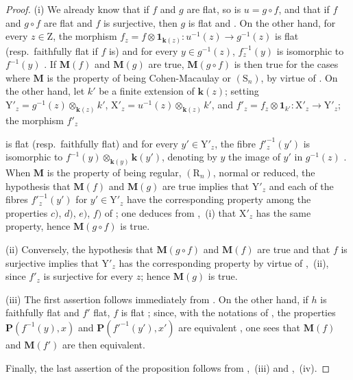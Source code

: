 \begin{proof}
(i) We already know that if $f$ and $g$ are flat, so is $u=g\circ f$, and that if $f$ and $g\circ f$ are flat and $f$ is surjective, then $g$ is flat  and . On the other hand, for every $z\in\mathrm{Z}$, the morphism $f_z=f\otimes\mathbf{1}_{\boldsymbol{k}(z)}:u^{-1}(z)\to g^{-1}(z)$ is flat (resp.\ faithfully flat if $f$ is) and for every $y\in g^{-1}(z)$, $f_z^{-1}(y)$ is isomorphic to $f^{-1}(y)$ . If $\boldsymbol{M}(f)$ and $\boldsymbol{M}(g)$ are true, $\boldsymbol{M}(g\circ f)$ is then true for the cases where $\boldsymbol{M}$ is the property of being Cohen-Macaulay or $(\mathrm{S}_n)$, by virtue of . On the other hand, let $k'$ be a finite extension of $\boldsymbol{k}(z)$; setting $\mathrm{Y}'_z=g^{-1}(z)\otimes_{\boldsymbol{k}(z)}k'$, $\mathrm{X}'_z=u^{-1}(z)\otimes_{\boldsymbol{k}(z)}k'$, and $f'_z=f_z\otimes\mathbf{1}_{k'}:\mathrm{X}'_z\to\mathrm{Y}'_z$; the morphism $f'_z$


is flat (resp.\ faithfully flat) and for every $y'\in\mathrm{Y}'_z$, the fibre $f'^{-1}_z(y')$ is isomorphic to $f^{-1}(y)\otimes_{\boldsymbol{k}(y)}\boldsymbol{k}(y')$, denoting by $y$ the image of $y'$ in $g^{-1}(z)$ . When $\boldsymbol{M}$ is the property of being regular, $(\mathrm{R}_n)$, normal or reduced, the hypothesis that $\boldsymbol{M}(f)$ and $\boldsymbol{M}(g)$ are true implies that $\mathrm{Y}'_z$ and each of the fibres $f'^{-1}_z(y')$ for $y'\in\mathrm{Y}'_z$ have the corresponding property among the properties $c)$, $d)$, $e)$, $f)$ of ; one deduces from ,~(i) that $\mathrm{X}'_z$ has the same property, hence $\boldsymbol{M}(g\circ f)$ is true.

(ii) Conversely, the hypothesis that $\boldsymbol{M}(g\circ f)$ and $\boldsymbol{M}(f)$ are true and that $f$ is surjective implies that $\mathrm{Y}'_z$ has the corresponding property by virtue of ,~(ii), since $f'_z$ is surjective for every $z$; hence $\boldsymbol{M}(g)$ is true.

(iii) The first assertion follows immediately from . On the other hand, if $h$ is faithfully flat and $f'$ flat, $f$ is flat ; since, with the notations of , the properties $\boldsymbol{P}(f^{-1}(y),x)$ and $\boldsymbol{P}(f'^{-1}(y'),x')$ are equivalent , one sees that $\boldsymbol{M}(f)$ and $\boldsymbol{M}(f')$ are then equivalent.

Finally, the last assertion of the proposition follows from ,~(iii) and ,~(iv).
\end{proof}

